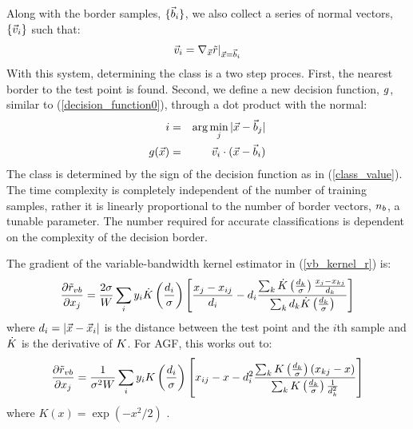 \documentclass[11pt]{article}
\begin{document}
Along with the border samples,  $\lbrace \vec b_i \rbrace$, we also
collect a series of normal vectors, $\lbrace \vec v_i \rbrace$
such that:
\begin{equation}
\vec v_i=\nabla_{\vec {x}}{\tilde r |_{\vec {x}=\vec b_i}}
\end{equation}
With this system, determining the class is a two step proces.
First, the nearest border to the test point is found.
Second, we define a new decision function, $g$, 
similar to (\ref{decision_function0}), through a dot product with the normal:
\begin{eqnarray}
	i & = & \arg \min_j |\vec {x} - \vec b_j| \\ \nonumber
	g(\vec {x}) & = & \vec v_i \cdot (\vec {x} - \vec b_i)
	\label{border_decision}
\end{eqnarray}
The class is determined by the sign of the decision function as in 
(\ref{class_value}).
The time complexity is completely independent of the number
of training samples, rather it is linearly proportional to the number of
border vectors, $n_b$, a tunable parameter. The number required for
accurate classifications is dependent on the complexity of the decision
border.

The gradient of the variable-bandwidth kernel estimator in 
(\ref{vb_kernel_r}) is:
\begin{equation}
	\frac{\partial \tilde r_{vb}}{\partial x_j} = 
	\frac{2 \sigma}{W} \sum_i y_i
	\dot {K} \left (\frac{d_i}{\sigma} \right )
	\left [\frac{x_j - x_{ij}}{d_i} 
	- d_i \frac{\sum_k \dot {K} \left (\frac{d_k}{\sigma} \right )
	\frac{x_j - x_{kj}}{d_k}}
{\sum_k d_k \dot {K} \left (\frac{d_k}{\sigma} \right )} \right ]
\label{kernel_gradient}
\end{equation}
where $d_i=|\vec {x} - \vec {x}_i|$ is the distance between the 
test point and the $i$th sample and $\dot {K}$ is the derivative
of $K$.
For AGF, this works out to:
\begin{equation}
	\frac{\partial \tilde r_{vb}}{\partial x_j} = 
	\frac{1}{\sigma^2 W} \sum_i y_i
	K \left (\frac{d_i}{\sigma} \right )
	\left [x_{ij} - x
	- d_i^2 \frac{\sum_k K \left (\frac{d_k}{\sigma} \right )
	\left (x_{kj} - x \right )}
{\sum_k K \left (\frac{d_k}{\sigma} \right )\frac{1}{d_k^2}} \right ]
\label{vb_gradient}
\end{equation}
where $K(x)=\exp(-x^2/2)$ \citep{Mills2011}.
\end{document}
